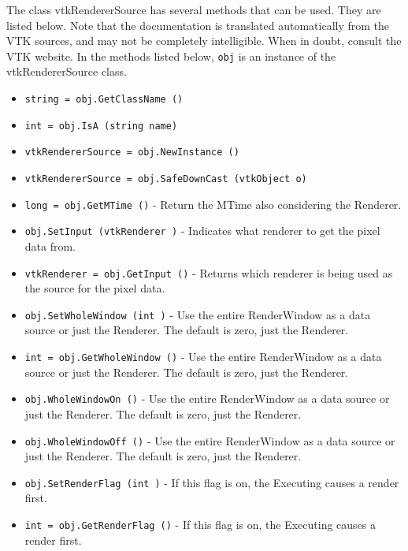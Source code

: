 The class vtkRendererSource has several methods that can be used.
  They are listed below.
Note that the documentation is translated automatically from the VTK sources,
and may not be completely intelligible.  When in doubt, consult the VTK website.
In the methods listed below, \verb|obj| is an instance of the vtkRendererSource class.
\begin{itemize}
\item  \verb|string = obj.GetClassName ()|

\item  \verb|int = obj.IsA (string name)|

\item  \verb|vtkRendererSource = obj.NewInstance ()|

\item  \verb|vtkRendererSource = obj.SafeDownCast (vtkObject o)|

\item  \verb|long = obj.GetMTime ()| -  Return the MTime also considering the Renderer.

\item  \verb|obj.SetInput (vtkRenderer )| -  Indicates what renderer to get the pixel data from.

\item  \verb|vtkRenderer = obj.GetInput ()| -  Returns which renderer is being used as the source for the pixel data.

\item  \verb|obj.SetWholeWindow (int )| -  Use the entire RenderWindow as a data source or just the Renderer.
 The default is zero, just the Renderer.

\item  \verb|int = obj.GetWholeWindow ()| -  Use the entire RenderWindow as a data source or just the Renderer.
 The default is zero, just the Renderer.

\item  \verb|obj.WholeWindowOn ()| -  Use the entire RenderWindow as a data source or just the Renderer.
 The default is zero, just the Renderer.

\item  \verb|obj.WholeWindowOff ()| -  Use the entire RenderWindow as a data source or just the Renderer.
 The default is zero, just the Renderer.

\item  \verb|obj.SetRenderFlag (int )| -  If this flag is on, the Executing causes a render first.

\item  \verb|int = obj.GetRenderFlag ()| -  If this flag is on, the Executing causes a render first.


\end{itemize}
